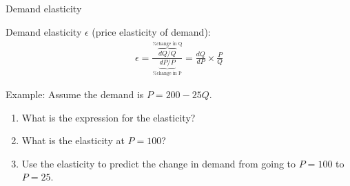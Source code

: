 \begin{frame}{Demand elasticity}

    Demand elasticity $\epsilon$ (price elasticity of demand):
    \begin{align*}
        \epsilon = \frac{\overbrace{dQ/Q}^{\text{\% change in Q}}}{\underbrace{dP/P}_{\text{\% change in P}}}
         = \frac{dQ}{dP} \times \frac{P}{Q}
    \end{align*}

    Example: Assume the demand is $P = 200 - 25 Q$. 
    \begin{enumerate}
        \item What is the expression for the elasticity? 
        \item What is the elasticity at $P=100$? 
        \item Use the elasticity to predict the change in demand from going to $P=100$ to $P=25$.
    \end{enumerate}
\end{frame}
